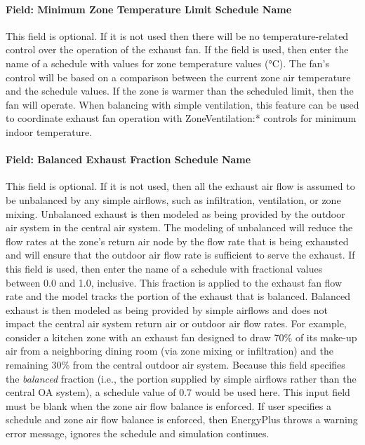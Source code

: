\paragraph{Field: Minimum Zone Temperature Limit Schedule Name}\label{field-minimum-zone-temperature-limit-schedule-name}

This field is optional. If it is not used then there will be no temperature-related control over the operation of the exhaust fan. If the field is used, then enter the name of a schedule with values for zone temperature values (\si{\celsius}). The fan's control will be based on a comparison between the current zone air temperature and the schedule values. If the zone is warmer than the scheduled limit, then the fan will operate. When balancing with simple ventilation, this feature can be used to coordinate exhaust fan operation with ZoneVentilation:* controls for minimum indoor temperature.

\paragraph{Field: Balanced Exhaust Fraction Schedule Name}\label{field-balanced-exhaust-fraction-schedule-name}

This field is optional. If it is not used, then all the exhaust air flow is assumed to be unbalanced by any simple airflows, such as infiltration, ventilation, or zone mixing. Unbalanced exhaust is then modeled as being provided by the outdoor air system in the central air system. The modeling of unbalanced will reduce the flow rates at the zone's return air node by the flow rate that is being exhausted and will ensure that the outdoor air flow rate is sufficient to serve the exhaust. If this field is used, then enter the name of a schedule with fractional values between 0.0 and 1.0, inclusive. This fraction is applied to the exhaust fan flow rate and the model tracks the portion of the exhaust that is balanced. Balanced exhaust is then modeled as being provided by simple airflows and does not impact the central air system return air or outdoor air flow rates. For example, consider a kitchen zone with an exhaust fan designed to draw 70\% of its make-up air from a neighboring dining room (via zone mixing or infiltration) and the remaining 30\% from the central outdoor air system. Because this field specifies the \emph{balanced} fraction (i.e., the portion supplied by simple airflows rather than the central OA system), a schedule value of 0.7 would be used here. This input field must be blank when the zone air flow balance is enforced. If user specifies a schedule and zone air flow balance is enforced, then EnergyPlus throws a warning error message, ignores the schedule and simulation continues.

